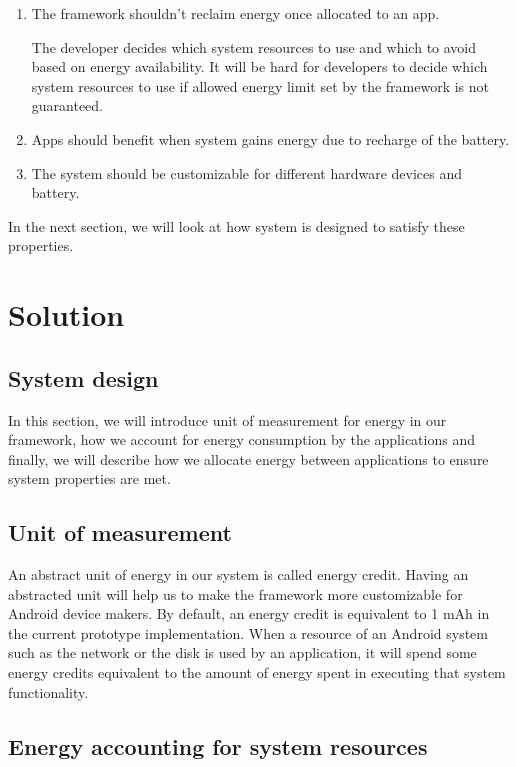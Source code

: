 \begin{enumerate}
\item The framework shouldn't reclaim energy once allocated to an app.  

The developer decides which system resources to use and which to avoid based on energy availability.  It will be hard for developers to decide which system resources to use if allowed energy limit set by the framework is not guaranteed.

\item Apps should benefit when system gains energy due to recharge of the battery.
\item The system should be customizable for different hardware devices and battery.

\end{enumerate}


In the next section, we will look at how system is designed to satisfy these properties.


\section{Solution}



\subsection{System design}


In this section, we will introduce unit of measurement for energy in our framework, how we account for energy consumption by the applications and finally, we will describe how we allocate energy between applications to ensure system properties are met.

\subsection{Unit of measurement}

An abstract unit of energy in our system is called energy credit. Having an abstracted unit will help us to make the framework more customizable for Android device makers. By default, an energy credit is equivalent to 1 mAh in the current prototype implementation. When a resource of an Android system such as the network or the disk is used by an application, it will spend some energy credits equivalent to the amount of energy spent in executing that system functionality.

\subsection{Energy accounting for system resources }

